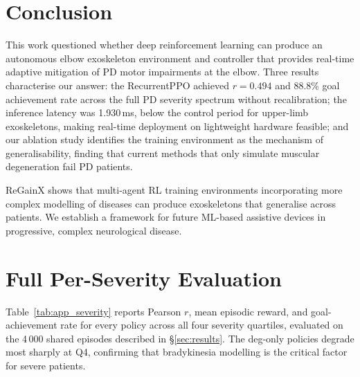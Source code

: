 \documentclass[letterpaper]{article} %
\begin{document}
\section{Conclusion}
\label{sec:conclusion}

This work questioned whether deep reinforcement learning can produce an
autonomous elbow exoskeleton environment and controller that provides real-time
adaptive mitigation of PD motor impairments at the elbow.
Three results characterise our answer: the RecurrentPPO achieved $r{=}0.494$
and 88.8\% goal achievement rate across the full PD severity spectrum without
recalibration; the inference latency was 1.930\,ms, below the control period
for upper-limb exoskeletons, making real-time deployment on lightweight hardware
feasible; and our ablation study identifies the training environment as the
mechanism of generalisability, finding that current methods that only simulate
muscular degeneration fail PD patients.

ReGainX shows that multi-agent RL training environments incorporating more
complex modelling of diseases can produce exoskeletons that generalise across
patients.
We establish a framework for future ML-based assistive devices in progressive,
complex neurological disease.




\appendix

\section{Full Per-Severity Evaluation}
\label{app:severity}

Table~\ref{tab:app_severity} reports Pearson $r$, mean episodic reward, and
goal-achievement rate for every policy across all four severity quartiles,
evaluated on the 4\,000 shared episodes described in \S\ref{sec:results}.
The deg-only policies degrade most sharply at Q4, confirming that
bradykinesia modelling is the critical factor for severe patients.
\end{document}
